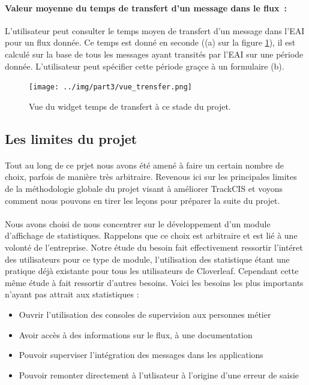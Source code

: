 			\paragraph{Valeur moyenne du temps de transfert d'un message dans le flux~: }
			L'utilisateur peut consulter le temps moyen de transfert d'un message dans
			l'EAI pour un flux donnée. Ce temps est donné en seconde ((a) sur la figure
			\ref{vue_trensfer}), il est calculé sur la base de tous les messages ayant
			transités par l'EAI sur une période donnée. L'utilisateur peut spécifier cette période graçce à un formulaire
			(b).
			\begin{figure}[H]
				\centering
				\texttt{[image: ../img/part3/vue\_trensfer.png]}
				\caption{\label{vue_trensfer} Vue du widget temps de transfert à ce stade
				du projet.}
			\end{figure}
		
		\subsection{Les limites du projet}
			\paragraph{}%
			Tout au long de ce prjet nous avons été amené à faire un certain nombre de
			choix, parfois de manière très arbitraire. Revenous ici sur les principales
			limites de la méthodologie globale du projet visant à améliorer TrackCIS et
			voyons comment nous pouvons en tirer les leçons pour préparer la suite du
			projet.
		
			\paragraph{}%
			Nous avons choisi de nous concentrer sur le développement d'un module
			d'affichage de statistiques. Rappelons que ce choix est arbitraire et est lié
			à une volonté de l'entreprise. Notre étude du besoin fait effectivement
			ressortir l'intéret des utilisateurs pour ce type de module, l'utilisation
			des statistique étant une pratique déjà existante pour tous les utilisateurs
			de Cloverleaf. Cependant cette même étude à fait ressortir d'autres besoins.
			Voici les besoins les plus importants n'ayant pas attrait aux statistiques :
			\begin{itemize}
			  \item Ouvrir l'utilisation des consoles de supervision aux personnes métier
			  \item Avoir accès à des informations sur le flux, à une documentation
			  \item Pouvoir superviser l'intégration des messages dans les applications
			  \item Pouvoir remonter directement à l'utlisateur à l'origine d'une erreur
			  de saisie
			\end{itemize}
			
